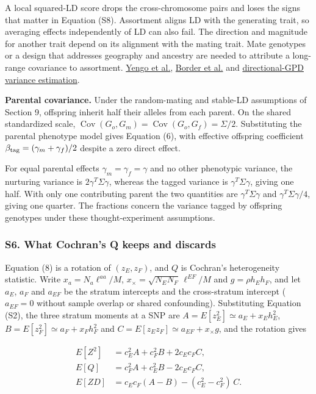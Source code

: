 \documentclass[11pt,a4paper]{article}
\begin{document}
A local squared-LD score drops the cross-chromosome pairs and loses the signs that matter in Equation (S8). Assortment aligns LD with the generating trait, so averaging effects independently of LD can also fail. The direction and magnitude for another trait depend on its alignment with the mating trait. Mate genotypes or a design that addresses geography and ancestry are needed to attribute a long-range covariance to assortment. \href{https://doi.org/10.1038/s41562-018-0476-3}{Yengo et al.}, \href{https://doi.org/10.1038/s41467-022-28294-9}{Border et al.} and \href{https://doi.org/10.1038/s41588-025-02192-4}{directional-GPD variance estimation}.

\textbf{Parental covariance.} Under the random-mating and stable-LD assumptions of Section 9, offspring inherit half their alleles from each parent. On the shared standardized scale, \(\operatorname{Cov}(G_o,G_m)=\operatorname{Cov}(G_o,G_f)=\Sigma/2\). Substituting the parental phenotype model gives Equation (6), with effective offspring coefficient \(\beta_{\rm tag}=(\gamma_m+\gamma_f)/2\) despite a zero direct effect.

For equal parental effects \(\gamma_m=\gamma_f=\gamma\) and no other phenotypic variance, the nurturing variance is \(2\gamma^T\Sigma\gamma\), whereas the tagged variance is \(\gamma^T\Sigma\gamma\), giving one half. With only one contributing parent the two quantities are \(\gamma^T\Sigma\gamma\) and \(\gamma^T\Sigma\gamma/4\), giving one quarter. The fractions concern the variance tagged by offspring genotypes under these thought-experiment assumptions.

\subsubsection{S6. What Cochran's Q keeps and discards}\label{s6-what-cochrans-q-keeps-and-discards}

Equation (8) is a rotation of \((z_E,z_F)\), and \(Q\) is Cochran's heterogeneity statistic. Write \(x_a=N_a\ell^{aa}/M\), \(x_\times=\sqrt{N_EN_F}\,\ell^{EF}/M\) and \(g=\rho h_Eh_F\), and let \(a_E\), \(a_F\) and \(a_{EF}\) be the stratum intercepts and the cross-stratum intercept (\(a_{EF}=0\) without sample overlap or shared confounding). Substituting Equation (S2), the three stratum moments at a SNP are \(A=E[z_E^2]\simeq a_E+x_Eh_E^2\), \(B=E[z_F^2]\simeq a_F+x_Fh_F^2\) and \(C=E[z_Ez_F]\simeq a_{EF}+x_\times g\), and the rotation gives

\[
\begin{aligned}
E[Z^2]&=c_E^2A+c_F^2B+2c_Ec_FC,\\
E[Q]&=c_F^2A+c_E^2B-2c_Ec_FC,\\
E[ZD]&=c_Ec_F(A-B)-(c_E^2-c_F^2)\,C.
\end{aligned}\tag{S9}
\]
\end{document}
